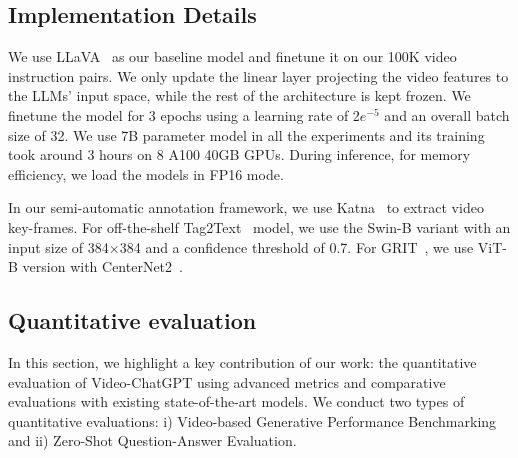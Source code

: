 \subsection{Implementation Details}
We use LLaVA~\cite{liu2023llava} as our baseline model and finetune it on our 100K video instruction pairs. We only update the linear layer projecting the video features to the LLMs' input space, while the rest of the architecture is kept frozen. We finetune the model for 3 epochs using a learning rate of 2$e^{-5}$ and an overall batch size of 32. We use 7B parameter model in all the experiments and its training took around 3 hours on 8 A100 40GB GPUs. During inference, for memory efficiency, we load the models in FP16 mode.

In our semi-automatic annotation framework, we use Katna~\cite{Katna} to extract video key-frames. For off-the-shelf Tag2Text~\cite{huang2023tag2text} model, we use the Swin-B variant with an input size of 384$\times$384 and a confidence threshold of 0.7. For GRIT~\cite{wu2022grit}, we use ViT-B version with CenterNet2~\cite{zhou2021probablistic}.

\subsection{Quantitative evaluation}
\label{quantitative_eval}
In this section, we highlight a key contribution of our work: the quantitative evaluation of Video-ChatGPT using advanced metrics and comparative evaluations with existing state-of-the-art models. We conduct two types of quantitative evaluations: i) Video-based Generative Performance Benchmarking and ii) Zero-Shot Question-Answer Evaluation.

